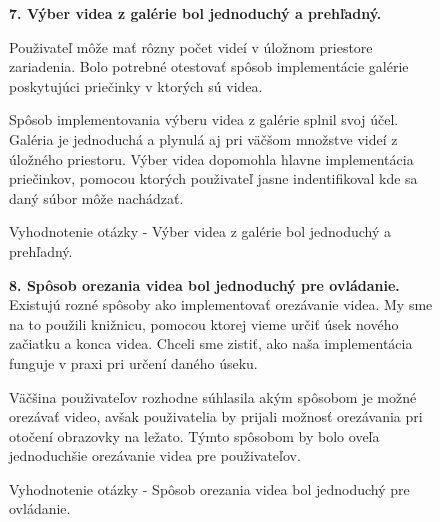 \begin{figure}[H]
\textbf{7. Výber videa z galérie bol
jednoduchý a prehľadný.}

Použivateľ môže mať rôzny počet videí v úložnom priestore zariadenia. Bolo potrebné otestovať spôsob implementácie galérie poskytujúci priečinky v ktorých sú videa.

Spôsob implementovania výberu videa z galérie splnil svoj účel. Galéria je jednoduchá a plynulá aj pri väčšom množstve videí z úložného priestoru. Výber videa dopomohla hlavne implementácia priečinkov, pomocou ktorých použivateľ jasne indentifikoval kde sa daný súbor môže nachádzať.

\caption{Vyhodnotenie otázky - Výber videa z galérie bol
jednoduchý a prehľadný.}
\end{figure}


\begin{figure}[H]
\textbf{8. Spôsob orezania videa bol jednoduchý pre ovládanie.}
Existujú rozné spôsoby ako implementovať orezávanie videa. My sme na to použili knižnicu, pomocou ktorej vieme určiť úsek nového začiatku a konca videa. Chceli sme zistiť, ako naša implementácia funguje v praxi pri určení daného úseku.

Väčšina použivateľov rozhodne súhlasila akým spôsobom je možné orezávať video, avšak použivatelia by prijali možnosť orezávania pri otočení obrazovky na ležato. Týmto spôsobom by bolo oveľa jednoduchšie orezávanie videa pre použivateľov.

\caption{Vyhodnotenie otázky - Spôsob orezania videa bol jednoduchý pre ovládanie.}
\end{figure}


